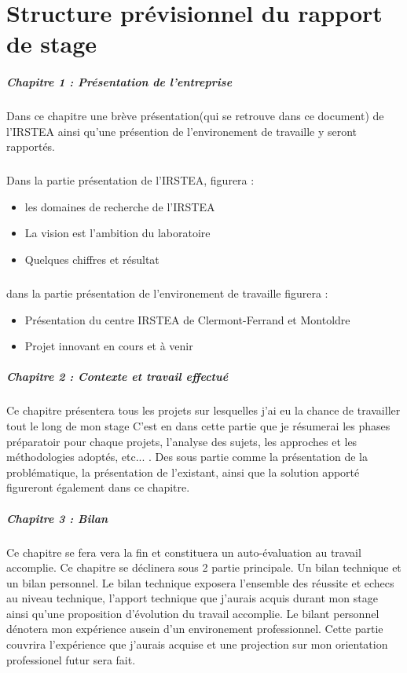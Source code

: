 \chapter{Structure prévisionnel du rapport de stage}
\paragraph{Chapitre 1 : Présentation de l'entreprise}
Dans ce chapitre une brève présentation(qui se retrouve dans ce document) de l'IRSTEA ainsi qu'une présention de l'environement de travaille y seront rapportés.
\paragraph{}
Dans la partie présentation de l'IRSTEA, figurera  : 
\begin{itemize}
 \item les domaines de recherche de l'IRSTEA
 \item La vision est l'ambition du laboratoire
 \item Quelques chiffres et résultat
 \end{itemize}
\paragraph{}
dans la partie présentation de l'environement de travaille figurera : 
\begin{itemize}
 \item Présentation du centre IRSTEA de Clermont-Ferrand et Montoldre
 \item Projet innovant en cours et à venir
 \end{itemize}



\paragraph{Chapitre 2 : Contexte et travail effectué}
Ce chapitre présentera tous les projets sur lesquelles j'ai eu la chance de travailler tout le long de mon stage
C'est en dans cette partie que je résumerai les phases préparatoir pour chaque projets, l'analyse des sujets, les approches et les méthodologies adoptés, etc... . Des sous partie comme la présentation de la problématique, la présentation de l'existant, ainsi que la solution apporté figureront également dans ce chapitre.

\paragraph{Chapitre 3 : Bilan}
Ce chapitre se fera vera la fin et constituera un auto-évaluation au travail accomplie. Ce chapitre se déclinera sous 2 partie principale. Un bilan technique et un bilan personnel. Le bilan technique exposera l'ensemble des réussite et echecs au niveau technique, l'apport technique que j'aurais acquis durant mon stage ainsi qu'une proposition d'évolution du travail accomplie. Le bilant personnel dénotera mon expérience ausein d'un environement professionnel. Cette partie couvrira l'expérience que j'aurais acquise et une projection sur mon orientation professionel futur sera fait.






